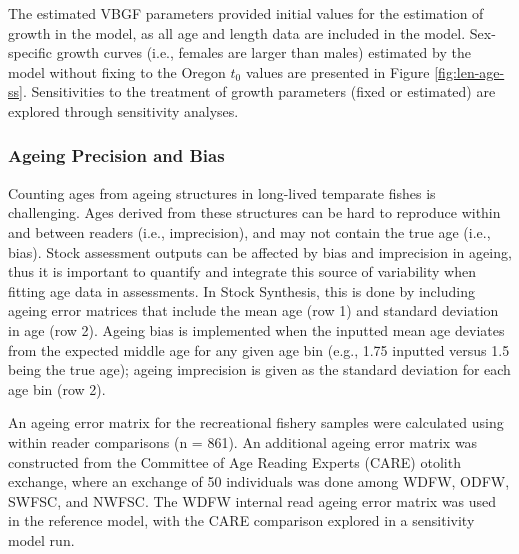 \documentclass[11pt,
  english,
  a4paper,
]{article}
\begin{document}
The estimated VBGF parameters provided initial values for the estimation of growth in the model, as all age and length data are included in the model. Sex-specific growth curves (i.e., females are larger than males) estimated by the model without fixing to the Oregon {\(t_0\)\leavevmode\tagmcend\tagstructend} values are presented in Figure \ref{fig:len-age-ss}. Sensitivities to the treatment of growth parameters (fixed or estimated) are explored through sensitivity analyses.

\leavevmode\tagmcend\tagstructend\par


\hypertarget{ageing-precision-and-bias}{%
\subsubsection{Ageing Precision and Bias}\label{ageing-precision-and-bias}}

\leavevmode\tagmcend\tagstructend


Counting ages from ageing structures in long-lived temparate fishes is challenging. Ages derived from these structures can be hard to reproduce within and between readers (i.e., imprecision), and may not contain the true age (i.e., bias). Stock assessment outputs can be affected by bias and imprecision in ageing, thus it is important to quantify and integrate this source of variability when fitting age data in assessments. In Stock Synthesis, this is done by including ageing error matrices that include the mean age (row 1) and standard deviation in age (row 2). Ageing bias is implemented when the inputted mean age deviates from the expected middle age for any given age bin (e.g., 1.75 inputted versus 1.5 being the true age); ageing imprecision is given as the standard deviation for each age bin (row 2).

\leavevmode\tagmcend\tagstructend\par


An ageing error matrix for the recreational fishery samples were calculated using within reader comparisons (n = 861). An additional ageing error matrix was constructed from the Committee of Age Reading Experts (CARE) otolith exchange, where an exchange of 50 individuals was done among WDFW, ODFW, SWFSC, and NWFSC. The WDFW internal read ageing error matrix was used in the reference model, with the CARE comparison explored in a sensitivity model run.
\end{document}
